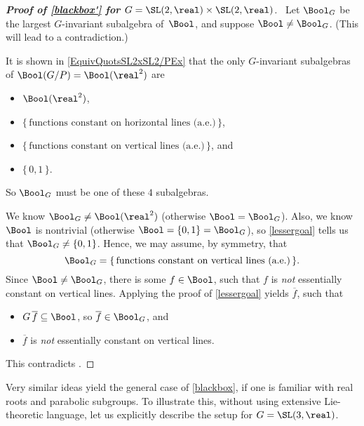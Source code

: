 \begin{proof}[\upshape \textbf{Proof of \cref{blackbox'} for $G = \SL(2,\real) \times \SL(2,\real)$}] \ 
Let $\Bool_G$ be the largest $G$-invariant subalgebra of~$\Bool$, and suppose $\Bool \neq \Bool_G$. (This will lead to a contradiction.)

It is shown in \cref{EquivQuotsSL2xSL2/PEx} that the only $G$-invariant subalgebras of $\Bool(G/P) = \Bool(\real^2)$ are  
\begin{itemize}
\item $\Bool(\real^2)$,
\item $\{\, \text{functions constant on horizontal lines (a.e.)} \,\}$,
\item $\{\, \text{functions constant on vertical lines (a.e.)} \,\}$,
and
\item $\{\, 0,1 \,\}$.
\end{itemize}
So $\Bool_G$ must be one of these $4$ subalgebras.

We know $\Bool_G \neq \Bool(\real^2)$ (otherwise $\Bool = \Bool_G$). 
Also, we know $\Bool$ is nontrivial (otherwise $\Bool = \{0,1\} = \Bool_G$), so \cref{lessergoal} tells us that $\Bool_G \neq \{0,1\}$.
Hence, we may assume, by symmetry, that 
	 \begin{equation} \label{BoolG=ConstVertEq}
	 \Bool_G = \{\, \text{functions constant on vertical lines (a.e.)} \,\}  
	 . \end{equation}
Since $\Bool \neq \Bool_G$, there is some $f \in \Bool$, such that $f$ is \emph{not} essentially constant on vertical lines.
Applying the proof of \cref{lessergoal} yields $\overline{f}$, such that
	\begin{itemize}
	\item $G \, \overline{f} \subseteq \Bool$, so $\overline{f} \in \Bool_G$,
	and
	\item $\overline{f}$ is \emph{not} essentially constant on vertical lines.
	\end{itemize}
This contradicts .
\end{proof}



Very similar ideas yield the general case of \cref{blackbox}, if one is familiar with real roots and parabolic subgroups. To illustrate this, without using extensive Lie-theoretic language, let us explicitly describe the setup for $G = \SL(3,\real)$.

